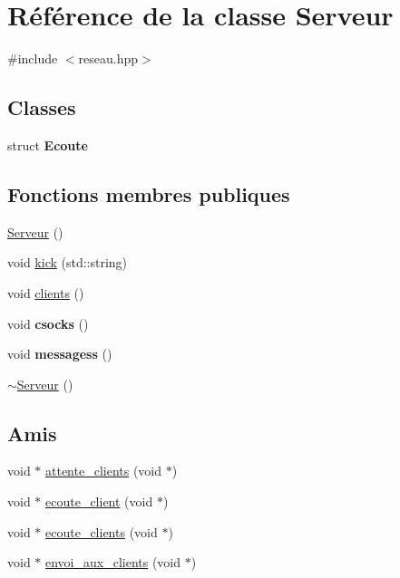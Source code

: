 \hypertarget{classServeur}{\section{Référence de la classe Serveur}
\label{classServeur}
}


{\ttfamily \#include $<$reseau.\-hpp$>$}

\subsection*{Classes}
\begin{DoxyCompactItemize}
\item 
struct {\bfseries Ecoute}
\end{DoxyCompactItemize}
\subsection*{Fonctions membres publiques}
\begin{DoxyCompactItemize}
\item 
\hyperlink{classServeur_a8a7a1df15a07e095436dedd0d40a0196}{Serveur} ()
\item 
void \hyperlink{classServeur_a7421ed36dd73bad688ef617b684688a7}{kick} (std\-::string)
\item 
void \hyperlink{classServeur_a88c66169c035dd9fb1d7a220e32b99f6}{clients} ()
\item 
\hypertarget{classServeur_af7bcbec1b825911c32f64eb9b2d23deb}{void {\bfseries csocks} ()}\label{classServeur_af7bcbec1b825911c32f64eb9b2d23deb}

\item 
\hypertarget{classServeur_ad2c277503a0abc4cb1a203340a055734}{void {\bfseries messagess} ()}\label{classServeur_ad2c277503a0abc4cb1a203340a055734}

\item 
\hyperlink{classServeur_a722aefd65c9efab0b3e0646bf3440ea1}{$\sim$\-Serveur} ()
\end{DoxyCompactItemize}
\subsection*{Amis}
\begin{DoxyCompactItemize}
\item 
void $\ast$ \hyperlink{classServeur_afb450ae26198b5e7e34d4e6d5939f9ee}{attente\-\_\-clients} (void $\ast$)
\item 
void $\ast$ \hyperlink{classServeur_ae17c0b8683120a4c6a61b5b38bed0225}{ecoute\-\_\-client} (void $\ast$)
\item 
void $\ast$ \hyperlink{classServeur_ac359cb70bf30e80424334f5c858f9d80}{ecoute\-\_\-clients} (void $\ast$)
\item 
void $\ast$ \hyperlink{classServeur_a3eb5f390c851d5db2e61b5bd5156b242}{envoi\-\_\-aux\-\_\-clients} (void $\ast$)
\end{DoxyCompactItemize}


